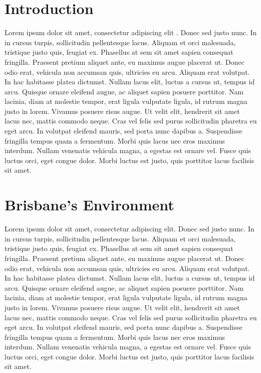 \documentclass[12pt,openany,oneside]{book}
\theoremstyle{definition}
\theoremstyle{definition}
\theoremstyle{definition}
\theoremstyle{remark}
\begin{document}
\mainmatter

\hypertarget{introduction}{%
\chapter{Introduction}\label{introduction}}

Lorem ipsum dolor sit amet, consectetur adipiscing elit
\citep{rexample1}. Donec sed justo nunc. In in cursus turpis,
sollicitudin pellentesque lacus. Aliquam et orci malesuada, tristique
justo quis, feugiat ex. Phasellus at sem sit amet sapien consequat
fringilla. Praesent pretium aliquet ante, eu maximus augue placerat ut.
Donec odio erat, vehicula non accumsan quis, ultricies eu arcu. Aliquam
erat volutpat. In hac habitasse platea dictumst. Nullam lacus elit,
luctus a cursus ut, tempus id arcu. Quisque ornare eleifend augue, ac
aliquet sapien posuere porttitor. Nam lacinia, diam at molestie tempor,
erat ligula vulputate ligula, id rutrum magna justo in lorem. Vivamus
posuere risus augue. Ut velit elit, hendrerit sit amet lacus nec, mattis
commodo neque. Cras vel felis sed purus sollicitudin pharetra eu eget
arcu. In volutpat eleifend mauris, sed porta nunc dapibus a. Suspendisse
fringilla tempus quam a fermentum. Morbi quis lacus nec eros maximus
interdum. Nullam venenatis vehicula magna, a egestas est ornare vel.
Fusce quis luctus orci, eget congue dolor. Morbi luctus est justo, quis
porttitor lacus facilisis sit amet.

\hypertarget{brisbanes-environment}{%
\chapter{Brisbane's Environment}\label{brisbanes-environment}}

Lorem ipsum dolor sit amet, consectetur adipiscing elit. Donec sed justo
nunc. In in cursus turpis, sollicitudin pellentesque lacus. Aliquam et
orci malesuada, tristique justo quis, feugiat ex. Phasellus at sem sit
amet sapien consequat fringilla. Praesent pretium aliquet ante, eu
maximus augue placerat ut. Donec odio erat, vehicula non accumsan quis,
ultricies eu arcu. Aliquam erat volutpat. In hac habitasse platea
dictumst. Nullam lacus elit, luctus a cursus ut, tempus id arcu. Quisque
ornare eleifend augue, ac aliquet sapien posuere porttitor. Nam lacinia,
diam at molestie tempor, erat ligula vulputate ligula, id rutrum magna
justo in lorem. Vivamus posuere risus augue. Ut velit elit, hendrerit
sit amet lacus nec, mattis commodo neque. Cras vel felis sed purus
sollicitudin pharetra eu eget arcu. In volutpat eleifend mauris, sed
porta nunc dapibus a. Suspendisse fringilla tempus quam a fermentum.
Morbi quis lacus nec eros maximus interdum. Nullam venenatis vehicula
magna, a egestas est ornare vel. Fusce quis luctus orci, eget congue
dolor. Morbi luctus est justo, quis porttitor lacus facilisis sit amet.
\end{document}
